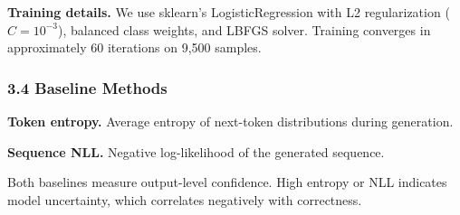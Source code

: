 \textbf{Training details.} We use sklearn's LogisticRegression with L2 regularization ($C = 10^{-3}$), balanced class weights, and LBFGS solver. Training converges in approximately 60 iterations on 9,500 samples.

\subsubsection{3.4 Baseline Methods}

\textbf{Token entropy.} Average entropy of next-token distributions during generation.

\textbf{Sequence NLL.} Negative log-likelihood of the generated sequence.

Both baselines measure output-level confidence. High entropy or NLL indicates model uncertainty, which correlates negatively with correctness.

